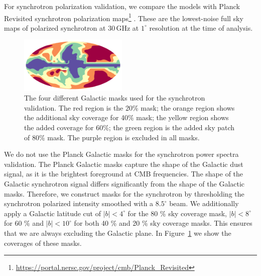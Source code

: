 \documentclass[twocolumn]{aastex631}
\begin{document}
For synchrotron polarization validation, we compare the models with Planck Revisited synchrotron polarization maps\footnote{\url{https://portal.nersc.gov/project/cmb/Planck\_Revisited}} \citep{Delabrouille:2024}. These are the lowest-noise full sky maps of polarized synchrotron at 30\,GHz at $1^\circ$ resolution at the time of analysis. 

\begin{figure}
    \centering
    \includegraphics[width=0.46\textwidth]{figures/SYNC_mask_stack.pdf}
    \caption{The four different Galactic masks used for the synchrotron validation. The red region is the 20\% mask; the orange region shows the additional sky coverage for 40\% mask; the yellow region shows the added coverage for 60\%; the green region is the added sky patch of 80\% mask. The purple region is excluded in all masks.}
    \label{fig:sync_masks}
\end{figure}

We do not use the Planck Galactic masks for the synchrotron power spectra validation. The Planck Galactic masks capture the shape of the Galactic dust signal, as it is the brightest foreground at CMB frequencies. The shape of the Galactic synchrotron signal differs significantly from the shape of the Galactic masks. Therefore, we construct masks for the synchrotron by thresholding the synchrotron polarized intensity smoothed with a $8.5^\circ$ beam. We additionally apply a Galactic latitude cut of $|b| < 4^\circ$ for the 80 \% sky coverage mask, $|b| < 8^\circ$ for 60 \% and $|b| < 10^\circ$ for both 40 \% and 20 \% sky coverage masks. This ensures that we are always excluding the Galactic plane. In Figure~\ref{fig:sync_masks} we show the coverages of these masks. 
\end{document}
